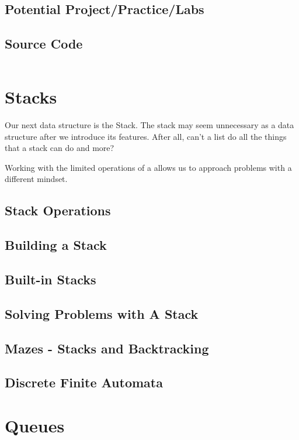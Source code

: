 \documentclass[10pt,a4paper]{book}
\begin{document}
\section{Potential Project/Practice/Labs}

\section{Source Code}
\inputminted{python3}{code/linkedlist.py}


\chapter{Stacks}
Our next data structure is the Stack.
The stack may seem unnecessary as a data structure after we introduce its features.  
After all, can't a list do all the things that a stack can do and more? 

Working with the limited operations of a allows us to approach problems with a different mindset.

\section{Stack Operations}


\section{Building a Stack}


\section{Built-in Stacks}

\section{Solving Problems with A Stack}


\section{Mazes - Stacks and Backtracking}



\section{Discrete Finite Automata}

\chapter{Queues}
\end{document}

